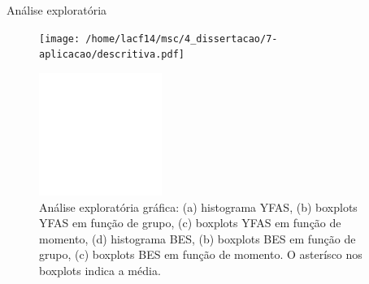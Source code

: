 \documentclass[
  ignorenonframetext,
  serif,
  professionalfont,
  usenames,
  dvipsnames,
  aspectratio = 169]{beamer}
\def\beginAThirdColumn{\begin{minipage}{0.31\textwidth}}%
\def\beginTwoThirdsColumn{\begin{minipage}{0.64\textwidth}}%
\def\endColumns{\end{minipage}}%
\begin{document}
\begin{frame}{Análise exploratória}
\protect\hypertarget{anuxe1lise-exploratuxf3ria}{}
\beginTwoThirdsColumn

\begin{figure}[H]
\centering
\texttt{[image: /home/lacf14/msc/4\_dissertacao/7-aplicacao/descritiva.pdf]}
\end{figure}

\endColumns\hfill
\beginAThirdColumn

\begin{figure}

{\centering \includegraphics[width=4cm]{defesa-lineu_files/figure-beamer/unnamed-chunk-3-1} 

}

\caption{Análise exploratória gráfica: (a) histograma YFAS, (b) boxplots YFAS em função de grupo, (c) boxplots YFAS em função de momento, (d) histograma BES, (b) boxplots BES em função de grupo, (c) boxplots BES em função de momento. O asterísco nos boxplots indica a média.}\label{fig:unnamed-chunk-3}
\end{figure}

\endColumns
\end{frame}
\end{document}
